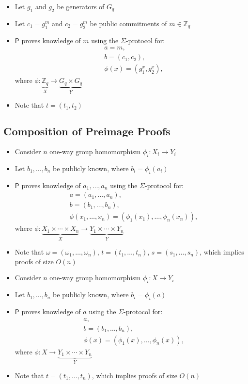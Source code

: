 \documentclass[bibtotoc,halfparskip,oneside]{scrreprt}
\newcommand{\Prover}{\ensuremath{\mathsf{P}}\xspace}
\begin{document}
	\begin{itemize}
		\item Let $g_1$ and $g_2$ be generators of $G_q$
		\item Let $c_1=g_1^{m}$ and $c_2=g_2^{m}$ be public commitments of $m\in\mathbb{Z}_q$ 
		\item $\Prover$ proves knowledge of $m$ using the $\Sigma$-protocol for:
		\begin{align*}
			&a=m,\\
			&b=(c_1,c_2),\\
			&\phi(x)=(g_1^{x},g_2^{x}),
		\end{align*}
		where $\phi:\underbrace{\mathbb{Z}_q}_X\rightarrow \underbrace{G_q\times G_q}_Y$
		\item Note that $t=(t_1,t_2)$
	\end{itemize}
	
	\subsection{Composition of Preimage Proofs}
	
	\begin{itemize}
		\item Consider $n$ one-way group homomorphism $\phi_i:X_i\rightarrow Y_i$ 
		\item Let $b_1,\ldots,b_n$ be publicly known, where $b_i=\phi_i(a_i)$
		\item $\Prover$ proves knowledge of $a_1,\ldots,a_n$ using the $\Sigma$-protocol for:
		\begin{align*}
			&a=(a_1,\ldots,a_n),\\
			&b=(b_1,\ldots,b_n),\\
			&\phi(x_1,\ldots,x_n)=(\phi_1(x_1),\ldots,\phi_n(x_n)),
		\end{align*}
		where $\phi: \underbrace{X_1\times\cdots\times X_n}_X\rightarrow \underbrace{Y_1\times\cdots\times Y_n}_Y$
		\item Note that $\omega=(\omega_1,\ldots,\omega_n)$, $t=(t_1,\ldots,t_n)$, $s=(s_1,\ldots,s_n)$, which implies proofs of size $O(n)$
	\end{itemize}
	
	\begin{itemize}
		\item Consider $n$ one-way group homomorphism $\phi_i:X\rightarrow Y_i$ 
		\item Let $b_1,\ldots,b_n$ be publicly known, where $b_i=\phi_i(a)$
		\item $\Prover$ proves knowledge of $a$ using the $\Sigma$-protocol for:
		\begin{align*}
			&a,\\
			&b=(b_1,\ldots,b_n),\\
			&\phi(x)=(\phi_1(x),\ldots,\phi_n(x)),
		\end{align*}
		where $\phi: X\rightarrow \underbrace{Y_1\times\cdots\times Y_n}_Y$
		\item Note that $t=(t_1,\ldots,t_n)$, which implies proofs of size $O(n)$
	\end{itemize}
	
\end{document}
